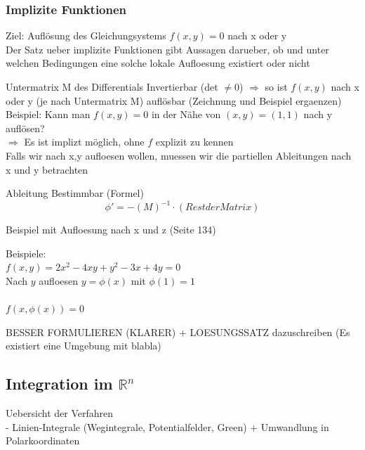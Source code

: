 \documentclass[6pt]{article}
\begin{document}
\begin{multicols*}{3}
	
	
	\subsubsection*{Implizite Funktionen}
		Ziel: Aufl{\"o}sung des Gleichungsystems $f(x,y) = 0$ nach x oder y \\
		
		Der Satz ueber implizite Funktionen gibt Aussagen darueber, ob und unter welchen Bedingungen eine solche lokale Aufloesung existiert oder nicht
		
		
		Untermatrix M des Differentials Invertierbar (det $\not = 0$)  $\Rightarrow $ so ist $f(x,y)$ nach x oder y (je nach Untermatrix M) aufl{\"o}sbar (Zeichnung und Beispiel ergaenzen) \\
		
		
		
		Beispiel: Kann man $f(x,y) = 0$ in der N{\"a}he von $(x,y)=(1,1)$ nach y aufl{\"o}sen? \\
		$\Rightarrow $ Es ist implizt m{\"o}glich, ohne $f$ explizit zu kennen \\
		
		
		
		Falls wir nach x,y aufloesen wollen, muessen wir die partiellen Ableitungen nach x und y betrachten
		
		Ableitung Bestimmbar (Formel)
		\[
				\phi ' = -(M)^{-1} \cdot (Rest der Matrix)
		\]

		Beispiel mit Aufloesung nach x und z (Seite 134)

			
		Beispiele: \\
		$f(x,y) = 2x^2 - 4xy + y^2 -3x + 4y = 0$ \\
		Nach $y$ aufloesen \qquad $y = \phi(x)$ mit $\phi(1)=1$ \\
		\\
		$f(x,\phi(x))=0$
		
		
		BESSER FORMULIEREN (KLARER) +
		LOESUNGSSATZ dazuschreiben (Es existiert eine Umgebung mit blabla)


\pagebreak
\subsection*{Integration im $\mathbb{R}^n$}

	Uebersicht der Verfahren \\
	- Linien-Integrale (Wegintegrale, Potentialfelder, Green)
	+ Umwandlung in Polarkoordinaten \\


\end{multicols*}
\end{document}
